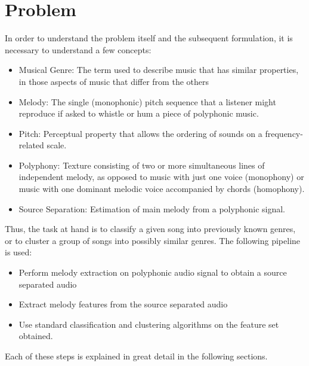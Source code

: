 \documentclass[12pt,journal,compsoc]{IEEEtran}
\begin{document}
\section{Problem}

In order to understand the problem itself and the subsequent formulation, it is necessary to understand a few concepts:
\begin{itemize}
\item Musical Genre: The term used to describe music that has similar properties, in those aspects of music that differ from the others
\item Melody: The single (monophonic) pitch sequence that a listener might reproduce if asked to whistle or hum a piece of polyphonic music.
\item Pitch: Perceptual property that allows the ordering of sounds on a frequency-related scale.
\item Polyphony: Texture consisting of two or more simultaneous lines of independent melody, as opposed to music with just one voice (monophony) or music with one dominant melodic voice accompanied by chords (homophony).
\item Source Separation: Estimation of main melody from a polyphonic signal.
\end{itemize}

Thus, the task at hand is to classify a given song into previously known genres, or to cluster a group of songs into possibly similar genres. The following pipeline is used:
\begin{itemize}
\item Perform melody extraction on polyphonic audio signal to obtain a source separated audio
\item Extract melody features from the source separated audio
\item Use standard classification and clustering algorithms on the feature set obtained.
\end{itemize}

Each of these steps is explained in great detail in the following sections.



\end{document}
